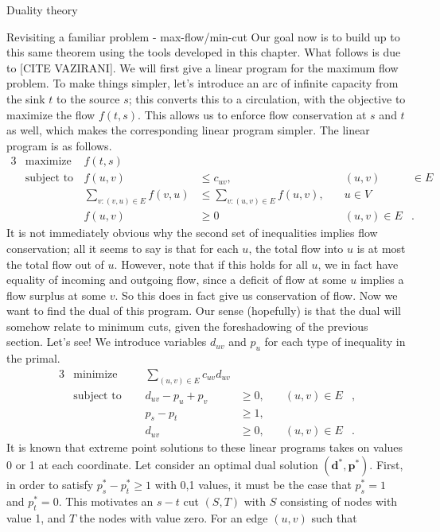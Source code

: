 \begin{section}{Duality theory}
\begin{subsection}{Revisiting a familiar problem - max-flow/min-cut}
	Our goal now is to build up to this same theorem using the tools developed in this chapter. 
	What follows is due to [CITE VAZIRANI]. We will first give a linear program for the 
	maximum flow problem. To make things simpler, let's introduce an arc of infinite capacity 
	from the sink $t$ to the source $s$; this converts this to a circulation, with the objective to 
	maximize the flow $f(t,s)$. This allows us to enforce flow conservation at $s$ and $t$ as well, 
	which makes the corresponding linear program simpler. The linear program is as follows.
	\begin{alignat*}{3}
		& \text{maximize } & f(t,s)\\
		& \text{subject to } & f(u,v) &\leq c_{uv}, &\quad (u,v)&\in E\\ 
				     && \sum_{v:(v,u)\in E} f(v,u) & \leq \sum_{v:(u,v)\in E} f(u,v), &
				     	\quad u\in V &\\
				     && f(u,v) &\geq 0 &\quad (u,v)\in E &.
	\end{alignat*}
	It is not immediately obvious why the second set of inequalities implies flow conservation; all 
	it seems to say is that for each $u$, the total flow into $u$ is at most the total flow out 
	of $u$. However, note that if this holds for all $u$, we in fact have equality of incoming and 
	outgoing flow, since a deficit of flow at some $u$ implies a flow surplus at some $v$. So 
	this does in fact give us conservation of flow. Now we want to find the dual of this program. 
	Our sense (hopefully) is that the dual will somehow relate to minimum cuts, given the 
	foreshadowing of the previous section. Let's see! We introduce variables $d_{uv}$ and $p_u$ for 
	each type of inequality in the primal.
	\begin{alignat*}{3}
		& \text{minimize } & \sum_{(u,v)\in E} c_{uv} d_{uv}& \\
		& \text{subject to } \quad & d_{uv} - p_u + p_v & \geq 0, & \quad (u,v)\in E &, \\
				    && p_s - p_t & \geq 1, & \\
				    && d_{uv} & \geq 0, & \quad (u,v) \in E &.
	\end{alignat*}
	It is known that extreme point solutions to these linear programs takes on values 0 or 1 at 
	each coordinate. Let consider an optimal dual solution $(\mathbf{d}^{*},\mathbf{p}^{*})$. 
	First, in order to satisfy $p_s^{*} - p_{t}^{*} \geq 1$ with 0,1 values, it must be the case 
	that $p_s^{*} = 1$ and $p_t^{*} = 0$. This motivates an $s-t$ cut $(S,T)$ with $S$ consisting 
	of nodes with value 1, and $T$ the nodes with value zero. For an edge $(u,v)$ such that 

\end{subsection}
\end{section}
